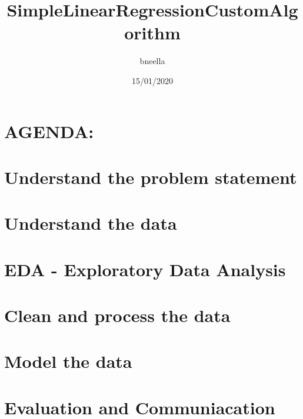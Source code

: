 \documentclass[]{article}
\title{SimpleLinearRegressionCustomAlgorithm}
\author{bneella}
\date{15/01/2020}
\newenvironment{Shaded}{\begin{snugshade}}{\end{snugshade}}
\newcommand{\DataTypeTok}[1]{\textcolor[rgb]{0.13,0.29,0.53}{#1}}
\newcommand{\KeywordTok}[1]{\textcolor[rgb]{0.13,0.29,0.53}{\textbf{#1}}}
\newcommand{\NormalTok}[1]{#1}
\newcommand{\OperatorTok}[1]{\textcolor[rgb]{0.81,0.36,0.00}{\textbf{#1}}}
\newcommand{\OtherTok}[1]{\textcolor[rgb]{0.56,0.35,0.01}{#1}}
\newcommand{\StringTok}[1]{\textcolor[rgb]{0.31,0.60,0.02}{#1}}
\begin{document}
\maketitle

\hypertarget{agenda}{%
\section{AGENDA:}\label{agenda}}

\hypertarget{understand-the-problem-statement}{%
\section{Understand the problem
statement}\label{understand-the-problem-statement}}

\hypertarget{understand-the-data}{%
\section{Understand the data}\label{understand-the-data}}

\hypertarget{eda---exploratory-data-analysis}{%
\section{EDA - Exploratory Data
Analysis}\label{eda---exploratory-data-analysis}}

\hypertarget{clean-and-process-the-data}{%
\section{Clean and process the data}\label{clean-and-process-the-data}}

\hypertarget{model-the-data}{%
\section{Model the data}\label{model-the-data}}

\hypertarget{evaluation-and-communiacation}{%
\section{Evaluation and
Communiacation}\label{evaluation-and-communiacation}}

\begin{Shaded}
\end{Shaded}
\end{document}
